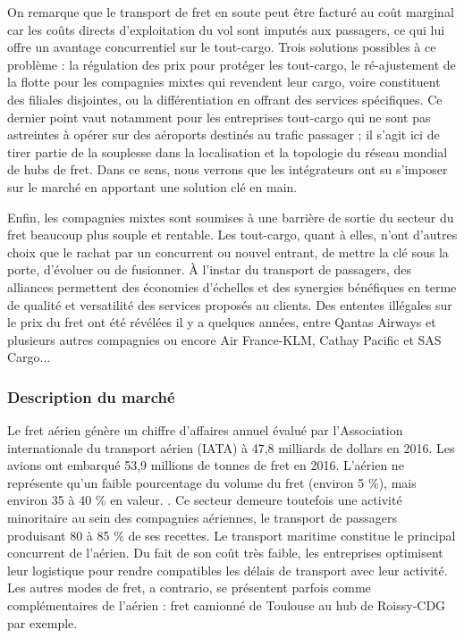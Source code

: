 On remarque que le transport de fret en soute peut être facturé au coût marginal car les coûts directs d'exploitation du vol sont imputés aux passagers, ce qui lui offre un avantage concurrentiel sur le tout-cargo. Trois solutions possibles à ce problème : la régulation des prix pour protéger les tout-cargo, le ré-ajustement de la flotte pour les compagnies mixtes qui revendent leur cargo, voire constituent des filiales disjointes, ou la différentiation en offrant des services spécifiques. Ce dernier point vaut notamment pour les entreprises tout-cargo qui ne sont pas astreintes à opérer sur des aéroports destinés au trafic passager ; il s'agit ici de tirer partie
de la souplesse dans la localisation et la topologie du réseau mondial de hubs de fret. Dans ce sens, nous verrons que les intégrateurs ont su s'imposer sur le marché en apportant une solution clé en main.


Enfin, les compagnies mixtes sont soumises à une barrière de sortie du secteur du fret beaucoup plus souple et rentable. Les tout-cargo, quant à elles, n'ont d'autres choix que le rachat par un concurrent ou nouvel entrant, de mettre la clé sous la porte, d'évoluer ou de fusionner. À l'instar du transport de passagers, des alliances permettent des économies d'échelles et des synergies bénéfiques en terme de qualité et versatilité des services proposés au clients. Des ententes illégales sur le prix du fret ont été révélées il y a quelques années, entre Qantas Airways et plusieurs autres compagnies ou encore Air France-KLM, Cathay Pacific et SAS Cargo...\cite{popescu}


\subsubsection{Description du marché}
Le fret aérien génère un chiffre d’affaires annuel évalué par l’Association internationale du transport aérien (IATA) à 47,8 milliards de dollars en 2016. Les avions ont embarqué 53,9 millions de tonnes de fret en 2016. L’aérien ne représente qu’un faible pourcentage du volume du fret (environ 5 \%),
mais environ 35 à 40 \% en valeur. \cite{lantenne}. Ce secteur demeure toutefois une activité minoritaire au sein des compagnies aériennes, le transport de passagers produisant 80 à 85 \% de ses recettes. Le transport maritime constitue le principal concurrent de l’aérien. Du fait de son coût très faible, les entreprises optimisent leur logistique pour rendre compatibles les délais de transport avec leur activité. Les autres modes de fret, a contrario, se présentent parfois comme complémentaires de l'aérien : fret camionné de Toulouse au hub de Roissy-CDG par exemple.


